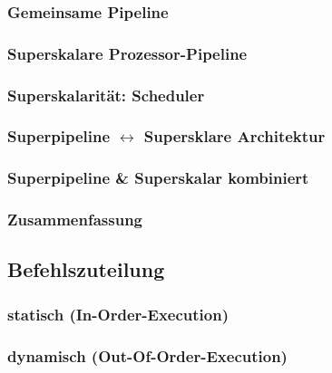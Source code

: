 \subsubsection*{Gemeinsame Pipeline}

\subsubsection*{Superskalare Prozessor-Pipeline}

\subsubsection{Superskalarität: Scheduler}


\subsubsection[Superpipeline <-> Supersklare Architektur]{Superpipeline $\leftrightarrow$ Supersklare Architektur}

\subsubsection{Superpipeline \& Superskalar kombiniert}

\subsubsection{Zusammenfassung}

\subsection{Befehlszuteilung}

\subsubsection{statisch (In-Order-Execution)}

\subsubsection{dynamisch (Out-Of-Order-Execution)}

